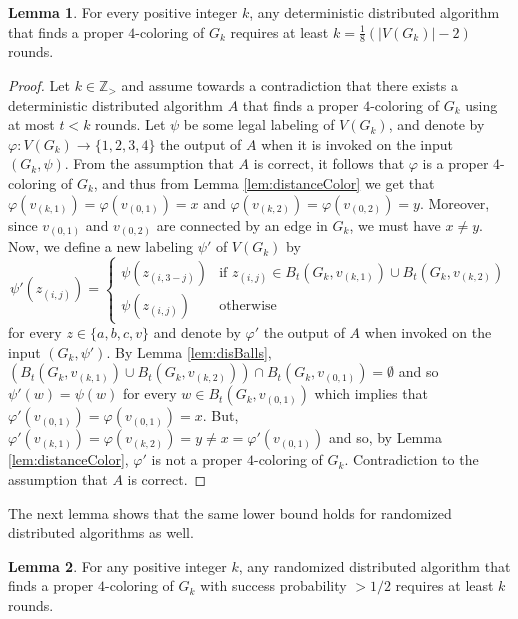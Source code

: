 \documentclass{article}
\theoremstyle{definition}
\newtheorem{lemma}{Lemma}[section]
\def \Z {{\mathbb Z}}
\begin{document}
\begin{lemma} For every positive integer $k$, any deterministic distributed algorithm that finds a proper $4$-coloring of $G_k$ requires at least $k = \frac{1}{8}(|V(G_k)|-2)$ rounds.\label{lem:lowerBoundDet}\end{lemma}

\begin{proof} Let $k \in \Z_{>}$ and assume towards a contradiction that there exists a deterministic distributed algorithm $A$ that finds a proper $4$-coloring of $G_k$ using at most $t < k$ rounds. Let $\psi$ be some legal labeling of $V(G_k)$, and denote by $\varphi:V(G_k) \to \{1,2,3,4\}$ the output of $A$ when it is invoked on the input $(G_k,\psi)$. From the assumption that $A$ is correct, it follows that $\varphi$ is a proper $4$-coloring of $G_k$, and thus from Lemma \ref{lem:distanceColor} we get that $\varphi(v_{(k,1)}) = \varphi(v_{(0,1)}) = x$ and $\varphi(v_{(k,2)}) = \varphi(v_{(0,2)}) = y$. Moreover, since $v_{(0,1)}$ and $v_{(0,2)}$ are connected by an edge in $G_{k}$, we must have $x \ne y$. Now, we define a new labeling $\psi'$ of $V(G_k)$ by $$\psi'(z_{(i,j)}) = \begin{cases}
		\psi(z_{(i,3-j)}) & \text{if } z_{(i,j)} \in B_{t}(G_k, v_{(k,1)}) \cup B_{t}(G_k, v_{(k,2)}) \\
		\psi(z_{(i,j)}) & \text{otherwise}
	\end{cases}  $$
	for every $z \in \{a,b,c,v\}$ and denote by $\varphi'$ the output of $A$ when invoked on the input $(G_{k},\psi')$.
By Lemma \ref{lem:disBalls}, $(B_{t}(G_{k},v_{(k,1)}) \cup B_{t}(G_{k},v_{(k,2)})) \cap B_{t}(G_{k},v_{(0,1)}) = \emptyset$ and so $\psi'(w) = \psi(w)$ for every $w \in B_{t}(G_{k},v_{(0,1)})$ which implies that $\varphi'(v_{(0,1)}) = \varphi(v_{(0,1)}) = x$. But, $\varphi'(v_{(k,1)}) = \varphi(v_{(k,2)}) = y \ne x = \varphi'(v_{(0,1)})$ and so, by Lemma \ref{lem:distanceColor}, $\varphi'$ is not a proper $4$-coloring of $G_k$. Contradiction to the assumption that $A$ is correct.\end{proof}

		

The next lemma shows that the same lower bound holds for randomized distributed algorithms as well.

\begin{lemma} For any positive integer $k$, any randomized distributed algorithm that finds a proper $4$-coloring of $G_k$ with success probability $>1/2$ requires at least $k$ rounds.\label{lem:lowerBoundRand}\end{lemma}
\end{document}
